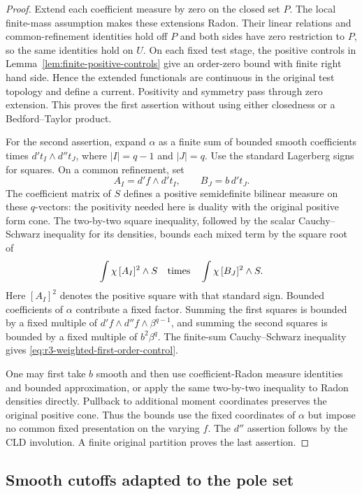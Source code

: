 \documentclass[11pt,a4paper]{article}
\numberwithin{equation}{section}
\theoremstyle{definition}
\theoremstyle{remark}
\begin{document}
\begin{proof}
Extend each coefficient measure by zero on the closed set $P$.
The local finite-mass assumption makes these extensions Radon.
Their linear relations and common-refinement identities hold
off $P$ and both sides have zero restriction to $P$, so the same
identities hold on $U$. On each fixed test stage, the positive
controls in Lemma~\ref{lem:finite-positive-controls} give
an order-zero bound with finite right hand side. Hence the
extended functionals are continuous in the original test
topology and define a current. Positivity and symmetry pass
through zero extension. This proves the first assertion without
using either closedness or a Bedford--Taylor product.

For the second assertion, expand $\alpha$ as a finite sum of
bounded smooth coefficients times
$d't_I\wedge d''t_J$, where $|I|=q-1$ and $|J|=q$.
Use the standard Lagerberg signs for squares. On a common
refinement, set
\[
 A_I=d'f\wedge d't_I,\qquad B_J=b\,d't_J.
\]
The coefficient matrix of $S$ defines a positive semidefinite
bilinear measure on these $q$-vectors: the positivity needed
here is duality with the original positive form cone. The
two-by-two square inequality, followed by the scalar
Cauchy--Schwarz inequality for its densities, bounds each
mixed term by the square root of
\[
 \int\chi\, [A_I]^2\wedge S
       \quad\hbox{times}\quad
 \int\chi\, [B_J]^2\wedge S.
\]
Here $[A_I]^2$ denotes the positive square with that standard
sign. Bounded coefficients of $\alpha$ contribute a fixed
factor. Summing the first squares is bounded by a fixed
multiple of $d'f\wedge d''f\wedge\beta^{q-1}$, and summing
the second squares is bounded by a fixed multiple of
$b^2\beta^q$. The finite-sum Cauchy--Schwarz inequality
gives \eqref{eq:r3-weighted-first-order-control}.

One may first take $b$ smooth and then use coefficient-Radon
measure identities and bounded approximation, or apply the
same two-by-two inequality to Radon densities directly.
Pullback to additional moment coordinates preserves the
original positive cone. Thus the bounds use the fixed
coordinates of $\alpha$ but impose no common fixed
presentation on the varying $f$. The $d''$ assertion follows
by the CLD involution. A finite original partition proves
the last assertion.
\end{proof}

\subsection{Smooth cutoffs adapted to the pole set}
\end{document}
